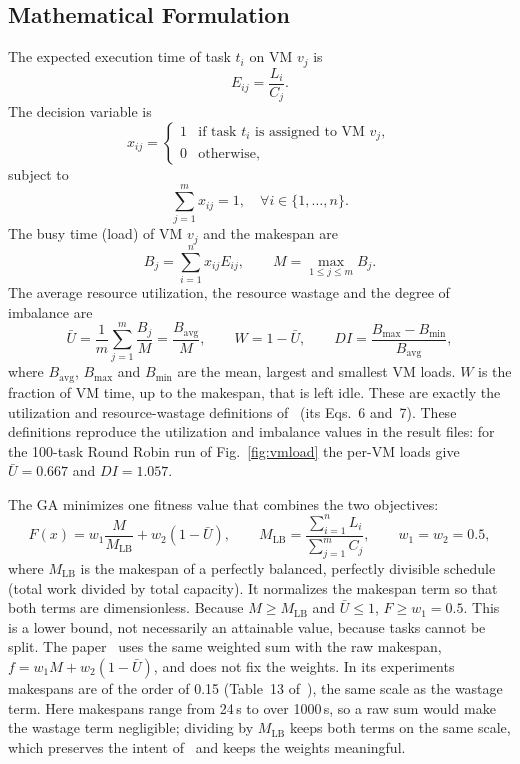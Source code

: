 \documentclass[journal,onecolumn,12pt]{IEEEtran}
\newcommand{\MLB}{M_{\mathrm{LB}}}
\newcommand{\Ubar}{\bar{U}}
\begin{document}
\subsection{Mathematical Formulation}
The expected execution time of task $t_i$ on VM $v_j$ is
\begin{equation}
E_{ij}=\frac{L_i}{C_j}. \label{eq:E}
\end{equation}
The decision variable is
\begin{equation}
x_{ij}=\begin{cases}1 & \text{if task } t_i \text{ is assigned to VM } v_j,\\ 0 & \text{otherwise,}\end{cases}\label{eq:x}
\end{equation}
subject to
\begin{equation}
\sum_{j=1}^{m} x_{ij}=1,\quad \forall i\in\{1,\dots,n\}. \label{eq:assign}
\end{equation}
The busy time (load) of VM $v_j$ and the makespan are
\begin{equation}
B_j=\sum_{i=1}^{n}x_{ij}E_{ij}, \qquad M=\max_{1\le j\le m}B_j. \label{eq:M}
\end{equation}
The average resource utilization, the resource wastage and the degree of imbalance are
\begin{equation}
\Ubar=\frac{1}{m}\sum_{j=1}^{m}\frac{B_j}{M}=\frac{B_{\mathrm{avg}}}{M},\qquad W=1-\Ubar,\qquad
DI=\frac{B_{\max}-B_{\min}}{B_{\mathrm{avg}}}, \label{eq:U}
\end{equation}
where $B_{\mathrm{avg}}$, $B_{\max}$ and $B_{\min}$ are the mean, largest and smallest VM loads. $W$ is the fraction of VM time, up to the makespan, that is left idle. These are exactly the utilization and resource-wastage definitions of~\cite{dehury} (its Eqs.~6 and~7). These definitions reproduce the utilization and imbalance values in the result files: for the 100-task Round Robin run of Fig.~\ref{fig:vmload} the per-VM loads give $\Ubar=0.667$ and $DI=1.057$.

The GA minimizes one fitness value that combines the two objectives:
\begin{equation}
F(x)=w_1\frac{M}{\MLB}+w_2\left(1-\Ubar\right),\qquad \MLB=\frac{\sum_{i=1}^{n}L_i}{\sum_{j=1}^{m}C_j},\qquad w_1=w_2=0.5, \label{eq:F}
\end{equation}
where $\MLB$ is the makespan of a perfectly balanced, perfectly divisible schedule (total work divided by total capacity). It normalizes the makespan term so that both terms are dimensionless. Because $M\ge\MLB$ and $\Ubar\le1$, $F\ge w_1=0.5$. This is a lower bound, not necessarily an attainable value, because tasks cannot be split. The paper~\cite{dehury} uses the same weighted sum with the raw makespan, $f=w_1M+w_2(1-\Ubar)$, and does not fix the weights. In its experiments makespans are of the order of 0.15 (Table~13 of~\cite{dehury}), the same scale as the wastage term. Here makespans range from 24\,s to over 1000\,s, so a raw sum would make the wastage term negligible; dividing by $\MLB$ keeps both terms on the same scale, which preserves the intent of~\cite{dehury} and keeps the weights meaningful.
\end{document}
